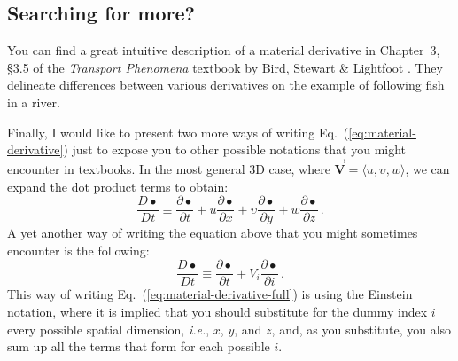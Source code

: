\begin{mdframed}[style=exercise-frame]

\subsection*{Searching for more?}

You can find a great intuitive description of a material derivative in Chapter~3, \S3.5 of the \textit{Transport Phenomena} textbook by Bird, Stewart \& Lightfoot \cite{bird2002transport}. They delineate differences between various derivatives on the example of following fish in a river.

\end{mdframed}


Finally, I would like to present two more ways of writing Eq.~(\ref{eq:material-derivative}) just to expose you to other possible notations that you might encounter in textbooks. 
In the most general 3D case, where $\vec{\bm{V}} = \langle u, \upsilon, w \rangle$, we can expand the dot product terms to obtain:
\begin{equation} \label{eq:material-derivative-full}
\frac{D \bullet}{D t} \equiv \frac{\partial \bullet}{\partial t} + u \frac{\partial \bullet}{\partial x} + \upsilon \frac{\partial \bullet}{\partial y} + w \frac{\partial \bullet}{\partial z} \, .
\end{equation}
A yet another way of writing the equation above that you might sometimes encounter is the following:
\begin{equation} \label{eq:material-derivative-ein stein}
\frac{D \bullet}{D t} \equiv \frac{\partial \bullet}{\partial t} + V_i \frac{\partial \bullet}{\partial i} \, .
\end{equation}
This way of writing Eq.~(\ref{eq:material-derivative-full}) is using the Einstein notation, where it is implied that you should substitute for the dummy index $i$ every possible spatial dimension, \textit{i.e.}, $x$, $y$, and $z$, and, as you substitute, you also sum up all the terms that form for each possible $i$.

